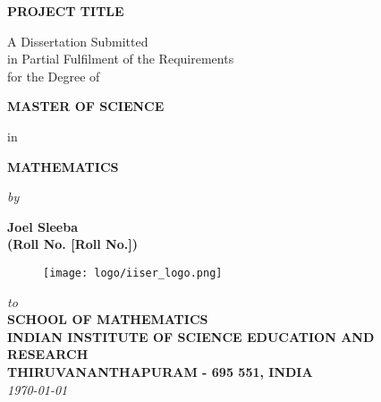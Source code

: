 \begin{titlepage}

\begin{center}

  \vfill

  \textbf{\Large PROJECT TITLE}\\[10pt]

  \vfill

  A Dissertation Submitted \\
  in Partial Fulfilment of the Requirements  \\
  for the Degree of  \\

  \vfill

  {\Large \bf MASTER OF SCIENCE }

  \vfill

  in

  \vfill

  {\large \bf MATHEMATICS }

  \vfill

  {\em  by} 

  \vfill

  {\large \bf Joel Sleeba} \\[0.3em] %
  {\large \bf (Roll No. [Roll No.])}\\[2em]

  \vfill

  \begin{figure}[h]
    \begin{center}
      \texttt{[image: logo/iiser\_logo.png]}
    \end{center}
  \end{figure}

  \vfill

  {\em\large to }\\[1em]
  {\bf\large SCHOOL OF MATHEMATICS} \\%
  {\bf\large INDIAN INSTITUTE OF SCIENCE EDUCATION AND RESEARCH}\\%
  {\bf\large THIRUVANANTHAPURAM - 695 551, INDIA}\\[1em]
  {\it\large \today }

\end{center}
\end{titlepage}

\clearpage


